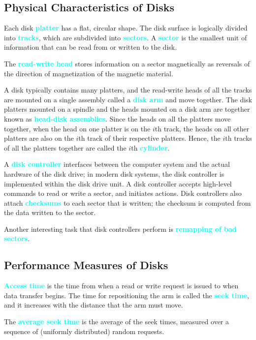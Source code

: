 \documentclass[a4paper,12pt,twoside,openany]{book}
\newcommand{\textcy}[1]{\textbf{\textcolor{cyan}{#1}}}
\begin{document}
\subsection{Physical Characteristics of Disks}

Each disk \textcy{platter} has a flat, circular shape. The disk surface is logically divided into \textcy{tracks}, which are subdivided into \textcy{sectors}. A \textcy{sector} is the smallest unit of information that can be read from or written to the disk.

The \textcy{read-write head} stores information on a sector magnetically as reversals of the direction of magnetization of the magnetic material.

A disk typically contains many platters, and the read-write heads of all the tracks are mounted on a single assembly called a \textcy{disk arm} and move together. The disk platters mounted on a spindle and the heads mounted on a disk arm are together known as \textcy{head-disk assemblies}. Since the heads on all the platters move together, when the head on one platter is on the $i$th track, the heads on all other platters are also on the $i$th track of their respective platters. Hence, the $i$th tracks of all the platters together are called the $i$th \textcy{cylinder}.

A \textcy{disk controller} interfaces between the computer system and the actual hardware of the disk drive; in modern disk systems, the disk controller is implemented within the disk drive unit. A disk controller accepts high-level commands to read or write a sector, and initiates actions. Disk controllers also attach \textcy{checksums} to each sector that is written; the checksum is computed from the data written to the sector.

Another interesting task that disk controllers perform is \textcy{remapping of bad sectors}.

\subsection{Performance Measures of Disks}

\textcy{Access time} is the time from when a read or write request is issued to when data transfer begins. The time for repositioning the arm is called the \textcy{seek time}, and it increases with the distance that the arm must move.

The \textcy{average seek time} is the average of the seek times, measured over a sequence of (uniformly distributed) random requests.
\end{document}
